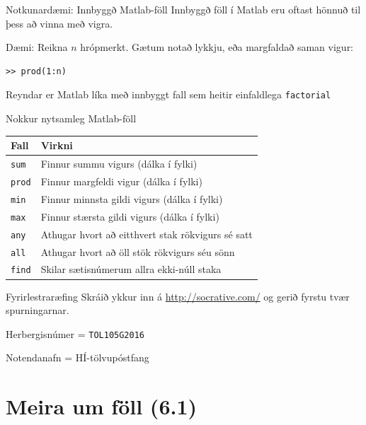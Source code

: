 \documentclass{beamer}
\begin{document}
\begin{frame}[fragile]{Notkunardæmi: Innbyggð Matlab-föll}
Innbyggð föll í Matlab eru oftast hönnuð til þess að vinna með vigra.

Dæmi: Reikna $n$ hrópmerkt. Gætum notað lykkju, eða margfaldað saman vigur:
\begin{verbatim}
>> prod(1:n)
\end{verbatim}
\pause Reyndar er Matlab líka með innbyggt fall sem heitir einfaldlega \texttt{factorial}
\end{frame}
\begin{frame}{Nokkur nytsamleg Matlab-föll}
\begin{center}
\begin{tabular}{ll}
\toprule
Fall			&Virkni\\
\midrule
\texttt{sum}		&Finnur summu vigurs (dálka í fylki)\\
\texttt{prod}		&Finnur margfeldi vigur (dálka í fylki)\\
\texttt{min}		&Finnur minnsta gildi vigurs (dálka í fylki)\\
\texttt{max}		&Finnur stærsta gildi vigurs (dálka í fylki)\\
\texttt{any}		&Athugar hvort að eitthvert stak rökvigurs sé satt\\
\texttt{all}		&Athugar hvort að öll stök rökvigurs séu sönn\\
\texttt{find}		&Skilar sætisnúmerum allra ekki-núll staka\\
\bottomrule
\end{tabular}
\end{center}
\end{frame}

\begin{frame}{Fyrirlestraræfing}
Skráið ykkur inn á \url{http://socrative.com/} og gerið fyrstu tvær spurningarnar.

Herbergisnúmer = \texttt{TOL105G2016}

Notendanafn = HÍ-tölvupóstfang
\end{frame}


\section{Meira um föll (6.1)}
\end{document}
